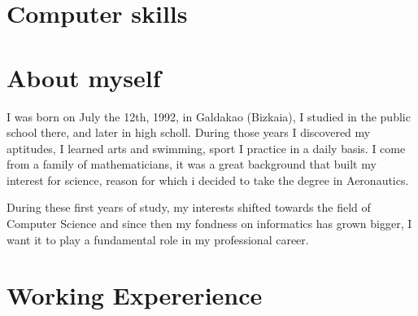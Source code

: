 \documentclass[11pt,a4paper]{moderncv}
\begin{document}
\pagebreak

\section{Computer skills}
\section{About myself}
\flushleft
I was born on July the 12th, 1992, in Galdakao (Bizkaia), I studied in the public school there, and later in high scholl. During those years I discovered my aptitudes, I learned arts and swimming, sport I practice in a daily basis. I come from a family of mathematicians, it was a great background that built my interest for science, reason for which i decided to take the degree in Aeronautics.

During these first years of study, my interests shifted towards the field of Computer Science and since then my fondness on informatics has grown bigger, I want it to play a fundamental role in my professional career.


\section{Working Expererience}


\end{document}
